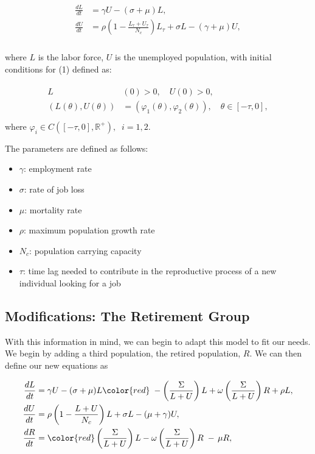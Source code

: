 \documentclass[11pt]{amsart}
\begin{document}
\begin{align}
    \begin{split}
        \frac{dL}{dt} &= \gamma U - (\sigma + \mu)L, \\
        \frac{dU}{dt} &= \rho \left(1 - \frac{L_{\tau} + U_{\tau}}{N_c} \right)L_{\tau} + \sigma L - (\gamma + \mu)U, \\
    \end{split}
\end{align}

where $L$ is the labor force, $U$ is the unemployed population, with initial conditions for (1) defined as:

\begin{align}
    \begin{split}
        L&(0) > 0, \quad U(0) > 0, \\
        (L(\theta),U(\theta)) &= (\varphi_1(\theta), \varphi_2(\theta)), \quad \theta \in [-\tau,0], \\
    \end{split}
\end{align}
where $\varphi_i\in C([-\tau, 0], \mathbb{R}^+),\;\; i=1,2$.

The parameters are defined as follows:

\begin{itemize}
    \item $\gamma$: employment rate
    \item $\sigma$: rate of job loss 
    \item $\mu$: mortality rate
    \item $\rho$: maximum population growth rate 
    \item $N_c$: population carrying capacity 
    \item $\tau$: time lag needed to contribute in the reproductive process of a new individual looking for a job
\end{itemize}

\subsection{Modifications: The Retirement Group}
 

With this information in mind, we can begin to adapt this model to fit our needs. We begin by adding a third population, the retired population, $R$.
We can then define our new equations as

\begin{align}
    \begin{split}
        \frac{dL}{dt} &= \gamma U - (\sigma + \mu)L {\color{red}\;- \left(\frac{\Sigma}{L + U}\right) L + \omega\left(\frac{\Sigma}{L + U}\right) R + \rho L},\\
        \frac{dU}{dt} &= \rho\left(1 - \frac{L + U}{N_c} \right)L + \sigma L -(\mu + \gamma)U,  \\
        \frac{dR}{dt} &= {\color{red}\left(\frac{\Sigma}{L + U}\right) L - \omega\left(\frac{\Sigma}{L + U}\right) R \; - \, \mu R},
    \end{split}
\end{align}
\end{document}
